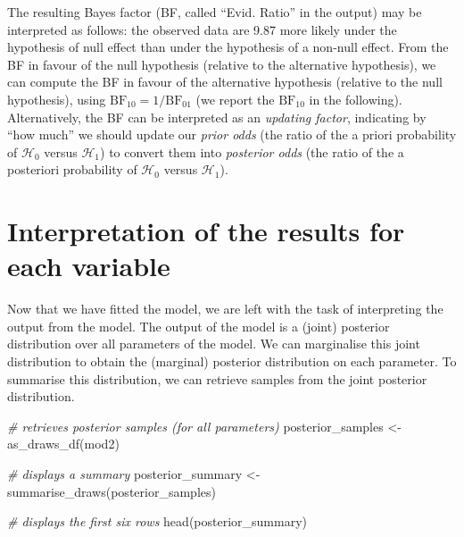 \documentclass[
  11pt,
  english,
  ,doc,mask,floatsintext]{apa6}
\newenvironment{Shaded}{}{}
\newcommand{\CommentTok}[1]{\textcolor[rgb]{0.38,0.63,0.69}{\textit{#1}}}
\newcommand{\FunctionTok}[1]{\textcolor[rgb]{0.02,0.16,0.49}{#1}}
\newcommand{\NormalTok}[1]{#1}
\newcommand{\OtherTok}[1]{\textcolor[rgb]{0.00,0.44,0.13}{#1}}
\begin{document}
The resulting Bayes factor (BF, called ``Evid. Ratio'' in the output) may be interpreted as follows: the observed data are 9.87 more likely under the hypothesis of null effect than under the hypothesis of a non-null effect. From the BF in favour of the null hypothesis (relative to the alternative hypothesis), we can compute the BF in favour of the alternative hypothesis (relative to the null hypothesis), using \(\text{BF}_{10} = 1 / \text{BF}_{01}\) (we report the \(\text{BF}_{10}\) in the following). Alternatively, the BF can be interpreted as an \emph{updating factor}, indicating by ``how much'' we should update our \emph{prior odds} (the ratio of the a priori probability of \(\mathcal{H}_{0}\) versus \(\mathcal{H}_{1}\)) to convert them into \emph{posterior odds} (the ratio of the a posteriori probability of \(\mathcal{H}_{0}\) versus \(\mathcal{H}_{1}\)).

\newpage

\hypertarget{interpretation-of-the-results-for-each-variable}{%
\section{Interpretation of the results for each variable}\label{interpretation-of-the-results-for-each-variable}}

Now that we have fitted the model, we are left with the task of interpreting the output from the model. The output of the model is a (joint) posterior distribution over all parameters of the model. We can marginalise this joint distribution to obtain the (marginal) posterior distribution on each parameter. To summarise this distribution, we can retrieve samples from the joint posterior distribution.

\begin{Shaded}
\begin{Highlighting}[]
\CommentTok{\# retrieves posterior samples (for all parameters)}
\NormalTok{posterior\_samples }\OtherTok{\textless{}{-}} \FunctionTok{as\_draws\_df}\NormalTok{(mod2)}

\CommentTok{\# displays a summary}
\NormalTok{posterior\_summary }\OtherTok{\textless{}{-}} \FunctionTok{summarise\_draws}\NormalTok{(posterior\_samples)}

\CommentTok{\# displays the first six rows}
\FunctionTok{head}\NormalTok{(posterior\_summary)}
\end{Highlighting}
\end{Shaded}
\end{document}
